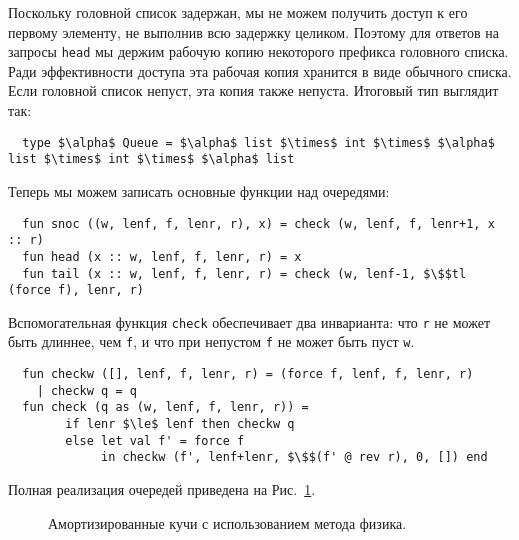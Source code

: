 Поскольку головной список задержан, мы не можем получить доступ к его
первому элементу, не выполнив всю задержку целиком.  Поэтому для
ответов на запросы \lstinline!head! мы держим рабочую копию некоторого
префикса головного списка. Ради эффективности доступа эта рабочая
копия хранится в виде обычного списка. Если головной список непуст,
эта копия также непуста. Итоговый тип выглядит так:
\begin{lstlisting}
  type $\alpha$ Queue = $\alpha$ list $\times$ int $\times$ $\alpha$ list $\times$ int $\times$ $\alpha$ list
\end{lstlisting}
Теперь мы можем записать основные функции над очередями:
\begin{lstlisting}
  fun snoc ((w, lenf, f, lenr, r), x) = check (w, lenf, f, lenr+1, x :: r)
  fun head (x :: w, lenf, f, lenr, r) = x
  fun tail (x :: w, lenf, f, lenr, r) = check (w, lenf-1, $\$$tl (force f), lenr, r)
\end{lstlisting}
Вспомогательная функция \lstinline!check! обеспечивает два инварианта:
что \lstinline!r! не может быть длиннее, чем \lstinline!f!, и что при
непустом \lstinline!f! не может быть пуст \lstinline!w!.
\begin{lstlisting}
  fun checkw ([], lenf, f, lenr, r) = (force f, lenf, f, lenr, r)
    | checkw q = q
  fun check (q as (w, lenf, f, lenr, r)) =
        if lenr $\le$ lenf then checkw q
        else let val f' = force f
             in checkw (f', lenf+lenr, $\$$(f' @ rev r), 0, []) end
\end{lstlisting}
Полная реализация очередей приведена на Рис.~\ref{fig:6.3}.

\begin{figure}
  \centering

  \caption{Амортизированные кучи с использованием метода физика.}
  \label{fig:6.3}
\end{figure}


